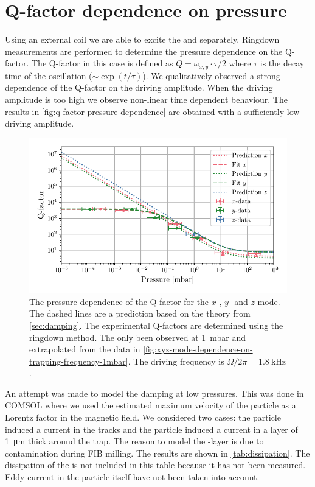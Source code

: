 \section{Q-factor dependence on pressure}
\label{sec:q-factor-dependence-on-pressure}
Using an external coil we are able to excite the \xmode  and \ymode separately. Ringdown measurements are performed to determine the pressure dependence on the Q-factor. The Q-factor in this case is defined as $Q = \omega_{x,y} \cdot \tau / 2$ where $\tau$ is the decay time of the oscillation ($\sim \exp\left(t / \tau\right)$). We qualitatively observed a strong dependence of the Q-factor on the driving amplitude. When the driving amplitude is too high we observe non-linear time dependent behaviour. The results in \autoref{fig:q-factor-pressure-dependence} are obtained with a sufficiently low driving amplitude.

\begin{figure}[h]
    \centering
    \includegraphics{figures/data/q_factor_pressure_dependence.pdf}
    \caption{The pressure dependence of the Q-factor for the $x$-, $y$- and $z$-mode. The dashed lines are a prediction based on the theory from \autoref{sec:damping}. The experimental Q-factors are determined using the ringdown method. The \zmode only been observed at \qty{1}{\milli\bar} and extrapolated from the data in \autoref{fig:xyz-mode-dependence-on-trapping-frequency-1mbar}. The driving frequency is $\Omega/2\pi = \qty{1.8}{\kilo\hertz}$.}
    \label{fig:q-factor-pressure-dependence}
\end{figure}

An attempt was made to model the damping at low pressures. This was done in COMSOL where we used the estimated maximum velocity of the particle as a Lorentz factor in the magnetic field. We considered two cases: the particle induced a current in the tracks and the particle induced a current in a  layer of \qty{1}{\micro\meter} thick around the trap. The reason to model the -layer is due to contamination during FIB milling. The results are shown in \autoref{tab:dissipation}. The dissipation of the \zmode is not included in this table because it has not been measured. Eddy current in the particle itself have not been taken into account.

